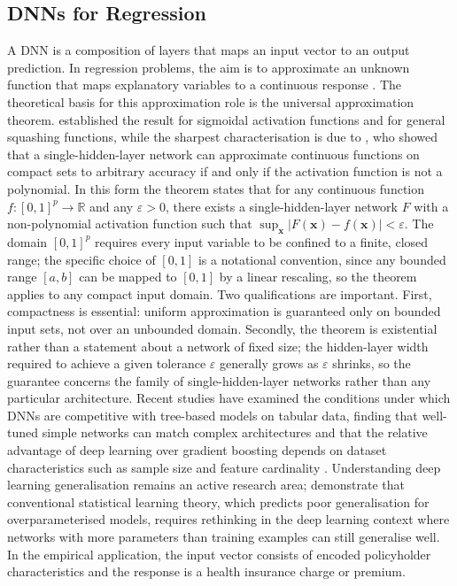 \subsection{DNNs for Regression}
\label{sec:dnn_regression}

\noindent
A DNN is a composition of layers that maps an input vector to an
output prediction. In regression problems, the aim is to approximate an unknown
function that maps explanatory variables to a continuous response
\citep{goodfellow2016deep, bishop2006pattern}.  The theoretical basis for
this approximation role is the universal approximation theorem.
\citet{cybenko1989approximation} established the result for sigmoidal
activation functions and \citet{hornik1989multilayer} for general
squashing functions, while the sharpest characterisation is due to
\citet{leshno1993multilayer}, who showed that a single-hidden-layer
network can approximate continuous functions on compact sets to arbitrary
accuracy if and only if the activation function is not a polynomial.  In
this form the theorem states that for any continuous function
$f: [0,1]^p \to \mathbb{R}$ and any $\varepsilon > 0$, there exists a
single-hidden-layer network $F$ with a non-polynomial activation function
such that
$\sup_{\mathbf{x}} |F(\mathbf{x}) - f(\mathbf{x})| < \varepsilon$.
The domain $[0,1]^p$ requires every input variable to be confined to a
finite, closed range; the specific choice of $[0,1]$ is a notational
convention, since any bounded range $[a,b]$ can be mapped to $[0,1]$ by a
linear rescaling, so the theorem applies to any compact input domain.
Two qualifications are important.  First, compactness is essential:
uniform approximation is guaranteed only on bounded input sets, not over
an unbounded domain.  Secondly, the theorem is existential rather than a
statement about a network of fixed size; the hidden-layer width required
to achieve a given tolerance $\varepsilon$ generally grows as
$\varepsilon$ shrinks, so the guarantee concerns the family of
single-hidden-layer networks rather than any particular architecture.  Recent studies have examined the
conditions under which DNNs are competitive with tree-based
models on tabular data, finding that well-tuned simple networks can match
complex architectures \citep{kadra2021welltuned} and that the relative advantage
of deep learning over gradient boosting depends on dataset characteristics such
as sample size and feature cardinality \citep{shwartzziv2022tabular}.
Understanding deep learning generalisation remains an active research area;
\citet{zhang2021understanding} demonstrate that conventional statistical
learning theory, which predicts poor generalisation for overparameterised
models, requires rethinking in the deep learning context where networks with
more parameters than training examples can still generalise well. In the empirical application, the
input vector consists of encoded policyholder characteristics and the response is
a health insurance charge or premium.

